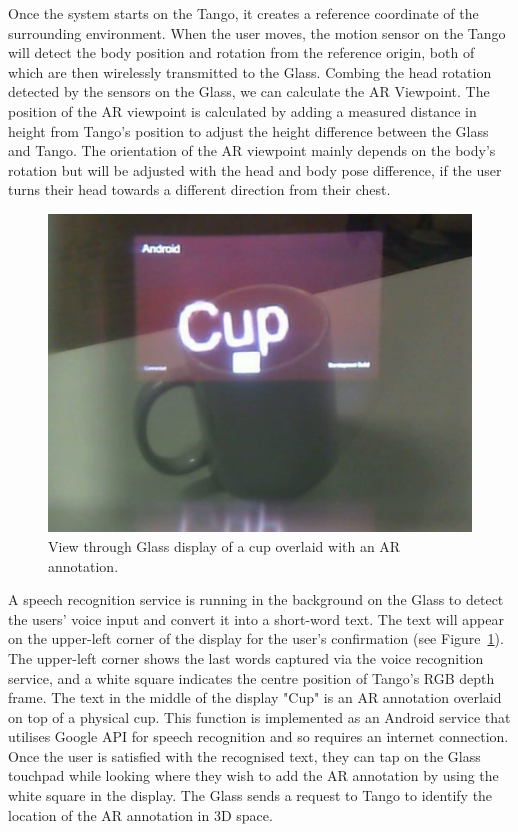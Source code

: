 Once the system starts on the Tango, it creates a reference coordinate of the surrounding environment. When the user moves, the motion sensor on the Tango will detect the body position and rotation from the reference origin, both of which are then wirelessly transmitted to the Glass. Combing the head rotation detected by the sensors on the Glass, we can calculate the AR Viewpoint. The position of the AR viewpoint is calculated by adding a measured distance in height from Tango's position to adjust the height difference between the Glass and Tango. The orientation of the AR viewpoint mainly depends on the body's rotation but will be adjusted with the head and body pose difference, if the user turns their head towards a different direction from their chest. 

\begin{figure}[ht]
  \centering
  \includegraphics[width=.8\linewidth]{images/mgia15/WIN_20150614_204531_2.jpg}
  \caption{View through Glass display of a cup overlaid with an AR annotation.}
  \label{fig:mgia15:ui}
\end{figure}

A speech recognition service is running in the background on the Glass to detect the users' voice input and convert it into a short-word text. The text will appear on the upper-left corner of the display for the user's confirmation (see Figure~\ref{fig:mgia15:ui}). The upper-left corner shows the last words captured via the voice recognition service, and a white square indicates the centre position of Tango's RGB depth frame. The text in the middle of the display "Cup" is an AR annotation overlaid on top of a physical cup. This function is implemented as an Android service that utilises Google API for speech recognition and so requires an internet connection. Once the user is satisfied with the recognised text, they can tap on the Glass touchpad while looking where they wish to add the AR annotation by using the white square in the display. The Glass sends a request to Tango to identify the location of the AR annotation in 3D space.

